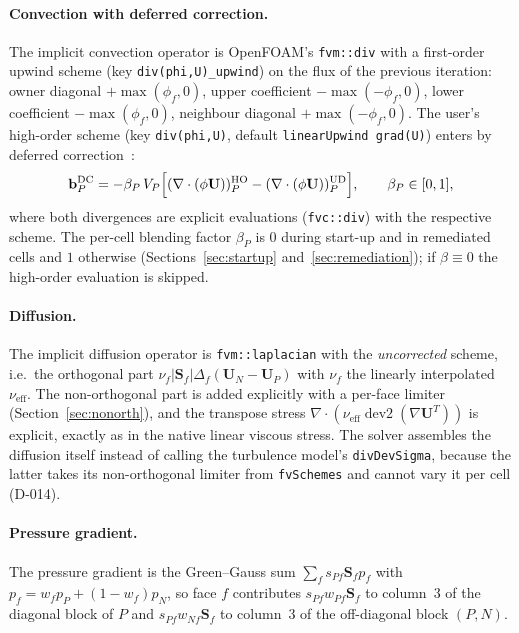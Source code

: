 \documentclass[11pt,a4paper]{article}
\newcommand{\vect}[1]{\mathbf{#1}}
\newcommand{\Uv}{\vect{U}}
\newcommand{\Sf}{\vect{S}_f}
\newcommand{\code}[1]{\texttt{#1}}
\begin{document}
\paragraph{Convection with deferred correction.}
The implicit convection operator is OpenFOAM's \code{fvm::div} with a
first-order upwind scheme (key \code{div(phi,U)\_upwind}) on the flux of the
previous iteration: owner diagonal $+\max(\phi_f,0)$, upper coefficient
$-\max(-\phi_f,0)$, lower coefficient $-\max(\phi_f,0)$, neighbour diagonal
$+\max(-\phi_f,0)$. The user's high-order scheme (key \code{div(phi,U)},
default \code{linearUpwind grad(U)}) enters by deferred
correction~\cite{Khosla1974,Ferziger2002}:
\begin{equation}
  \vect{b}^{\mathrm{DC}}_P = -\beta_P\,V_P\Bigl[
    (\nabla\cdot(\phi\Uv))^{\mathrm{HO}}_P - (\nabla\cdot(\phi\Uv))^{\mathrm{UD}}_P
  \Bigr],\qquad \beta_P\in[0,1],
  \label{eq:dc}
\end{equation}
where both divergences are explicit evaluations (\code{fvc::div}) with the
respective scheme. The per-cell blending factor $\beta_P$ is $0$ during
start-up and in remediated cells and $1$ otherwise
(Sections~\ref{sec:startup} and~\ref{sec:remediation}); if $\beta\equiv0$ the
high-order evaluation is skipped.

\paragraph{Diffusion.}
The implicit diffusion operator is \code{fvm::laplacian} with the
\emph{uncorrected} scheme, i.e.\ the orthogonal part
$\nu_f|\Sf|\Delta_f(\Uv_N-\Uv_P)$ with $\nu_f$ the linearly interpolated
$\nu_{\mathrm{eff}}$. The non-orthogonal part is added explicitly with a
per-face limiter (Section~\ref{sec:nonorth}), and the transpose stress
$\nabla\cdot(\nu_{\mathrm{eff}}\operatorname{dev2}(\nabla\Uv^T))$ is explicit,
exactly as in the native linear viscous stress. The solver assembles the
diffusion itself instead of calling the turbulence model's
\code{divDevSigma}, because the latter takes its non-orthogonal limiter from
\code{fvSchemes} and cannot vary it per cell (D-014).

\paragraph{Pressure gradient.}
The pressure gradient is the Green--Gauss sum
$\sum_f s_{Pf}\Sf p_f$ with $p_f=w_fp_P+(1-w_f)p_N$, so face $f$ contributes
$s_{Pf}w_{Pf}\Sf$ to column~3 of the diagonal block of $P$ and
$s_{Pf}w_{Nf}\Sf$ to column~3 of the off-diagonal block $(P,N)$.
\end{document}
